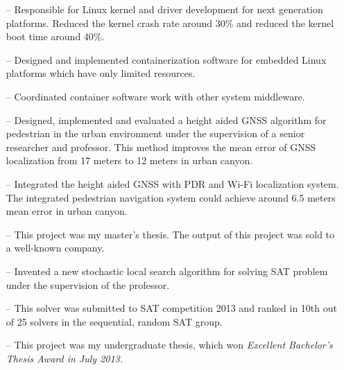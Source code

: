 \documentclass[10pt,a4paper,roman]{moderncv}        %
\begin{document}
\begin{itemize}
  \item[--]{Responsible for Linux kernel and driver development for next
    generation platforms. Reduced the kernel crash rate around 30\% and reduced the kernel boot time around 40\%.}
  \item[--]{Designed and implemented containerization software for embedded Linux
    platforms which have only limited resources.}
  \item[--]{Coordinated container software work with other system middleware.}
\end{itemize}

\begin{itemize}
  \item[--]{Designed, implemented and evaluated a height aided GNSS algorithm for
    pedestrian in the urban environment under the supervision of a senior researcher
  and professor. This method improves the mean error of GNSS localization from 17 meters to 12 meters in urban canyon.}
  \item[--]{Integrated the height aided GNSS with PDR and Wi-Fi localization system. The integrated pedestrian navigation system could achieve around 6.5 meters mean error in urban canyon.}
  \item[--]{This project was my master's thesis. The output of this project was sold to a well-known company.}
\end{itemize}

\begin{itemize}
  \item[--]{Invented a new stochastic local search algorithm for solving SAT problem under the supervision of the professor.}
  \item[--]{This solver was submitted to SAT competition 2013 and ranked in 10th out of 25 solvers in the sequential, random SAT group.}
  \item[--]{This project was my undergraduate thesis, which won \em{Excellent
Bachelor's Thesis Award} in July 2013.}
\end{itemize}
\end{document}
